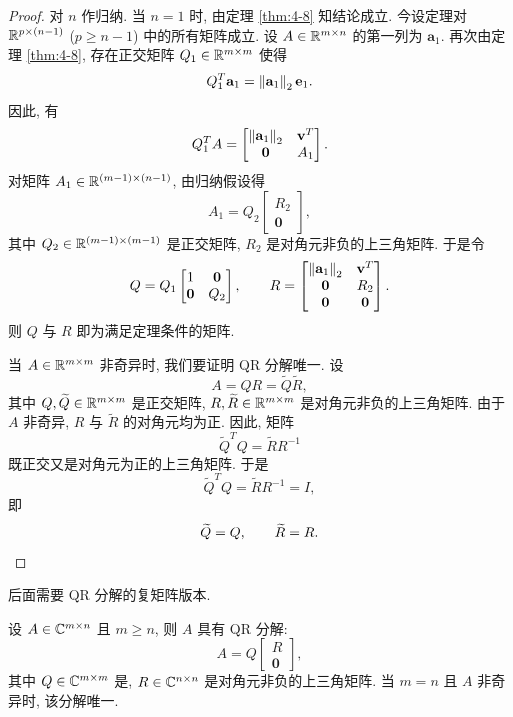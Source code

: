 \begin{proof}
对 $n$ 作归纳. 当 $n=1$ 时, 由定理 \ref{thm:4-8} 知结论成立. 今设定理对 $\mathbb{R}^{p\times(n-1)}$ ($p\geqslant n-1$) 中的所有矩阵成立. 设 $A\in\mathbb{R}^{m\times n}$ 的第一列为 $\mathbf{a}_1$. 再次由定理 \ref{thm:4-8}, 存在正交矩阵 $Q_1\in\mathbb{R}^{m\times m}$ 使得
\[
  Q_1^T\mathbf{a}_1=\left\|\mathbf{a}_1\right\|_2\mathbf{e}_1.
\]
因此, 有
\[
  Q_1^TA=
  \begin{bmatrix}
    \left\|\mathbf{a}_1\right\|_2 & \mathbf{v}^T\\
    \mathbf{0}            & A_1
  \end{bmatrix}.
\]
对矩阵 $A_1\in\mathbb{R}^{(m-1)\times(n-1)}$, 由归纳假设得
\[
  A_1=Q_2
  \begin{bmatrix}
    R_2\\
    \mathbf{0}
  \end{bmatrix},
\]
其中 $Q_2\in\mathbb{R}^{(m-1)\times(m-1)}$ 是正交矩阵, $R_2$ 是对角元非负的上三角矩阵. 于是令
\[
  Q=Q_1
  \begin{bmatrix}
    1 & \mathbf{0}\\
    \mathbf{0} & Q_2
  \end{bmatrix},
  \qquad
  R=
  \begin{bmatrix}
    \left\|\mathbf{a}_1\right\|_2 & \mathbf{v}^T\\
    \mathbf{0}            & R_2\\
    \mathbf{0}            & \mathbf{0}
  \end{bmatrix}.
\]
则 $Q$ 与 $R$ 即为满足定理条件的矩阵.

当 $A\in\mathbb{R}^{m\times m}$ 非奇异时, 我们要证明 QR 分解唯一. 设
\[
  A=QR=\widetilde{Q}\widetilde{R},
\]
其中 $Q,\widetilde{Q}\in\mathbb{R}^{m\times m}$ 是正交矩阵, $R,\widetilde{R}\in\mathbb{R}^{m\times m}$ 是对角元非负的上三角矩阵. 由于 $A$ 非奇异, $R$ 与 $\widetilde{R}$ 的对角元均为正. 因此, 矩阵
\[
  \widetilde{Q}^TQ=\widetilde{R}R^{-1}
\]
既正交又是对角元为正的上三角矩阵. 于是
\[
  \widetilde{Q}^TQ=\widetilde{R}R^{-1}=I,
\]
即
\[
  \widetilde{Q}=Q,\qquad\widetilde{R}=R. \qedhere
\]
\end{proof}

后面需要 QR 分解的复矩阵版本.

\begin{corollary}
\label{cor:4-2}
设 $A\in\mathbb{C}^{m\times n}$ 且 $m\geqslant n$, 则 $A$ 具有 QR 分解:
\[
  A=Q
  \begin{bmatrix}
    R\\
    \mathbf{0}
  \end{bmatrix},
\]
其中 $Q\in\mathbb{C}^{m\times m}$ 是, $R\in\mathbb{C}^{n\times n}$ 是对角元非负的上三角矩阵. 当 $m=n$ 且 $A$ 非奇异时, 该分解唯一.
\end{corollary}

